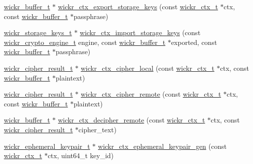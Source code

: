 \begin{DoxyCompactItemize}
\item 
\mbox{\hyperlink{structwickr__buffer}{wickr\+\_\+buffer\+\_\+t}} $\ast$ \mbox{\hyperlink{group__wickr__ctx_ga67e64bed3fc0a8ee550c0fc24d44c787}{wickr\+\_\+ctx\+\_\+export\+\_\+storage\+\_\+keys}} (const \mbox{\hyperlink{structwickr__ctx}{wickr\+\_\+ctx\+\_\+t}} $\ast$ctx, const \mbox{\hyperlink{structwickr__buffer}{wickr\+\_\+buffer\+\_\+t}} $\ast$passphrase)
\item 
\mbox{\hyperlink{structwickr__storage__keys}{wickr\+\_\+storage\+\_\+keys\+\_\+t}} $\ast$ \mbox{\hyperlink{group__wickr__ctx_gae344e5202193c4b92ee2686529285fe5}{wickr\+\_\+ctx\+\_\+import\+\_\+storage\+\_\+keys}} (const \mbox{\hyperlink{structwickr__crypto__engine}{wickr\+\_\+crypto\+\_\+engine\+\_\+t}} engine, const \mbox{\hyperlink{structwickr__buffer}{wickr\+\_\+buffer\+\_\+t}} $\ast$exported, const \mbox{\hyperlink{structwickr__buffer}{wickr\+\_\+buffer\+\_\+t}} $\ast$passphrase)
\item 
\mbox{\hyperlink{structwickr__cipher__result}{wickr\+\_\+cipher\+\_\+result\+\_\+t}} $\ast$ \mbox{\hyperlink{group__wickr__ctx_gaeff6704dded2d44f689eca5ad25843f8}{wickr\+\_\+ctx\+\_\+cipher\+\_\+local}} (const \mbox{\hyperlink{structwickr__ctx}{wickr\+\_\+ctx\+\_\+t}} $\ast$ctx, const \mbox{\hyperlink{structwickr__buffer}{wickr\+\_\+buffer\+\_\+t}} $\ast$plaintext)
\item 
\mbox{\hyperlink{structwickr__cipher__result}{wickr\+\_\+cipher\+\_\+result\+\_\+t}} $\ast$ \mbox{\hyperlink{group__wickr__ctx_ga0b985fb2cd05fb482b5ed175dfd650a0}{wickr\+\_\+ctx\+\_\+cipher\+\_\+remote}} (const \mbox{\hyperlink{structwickr__ctx}{wickr\+\_\+ctx\+\_\+t}} $\ast$ctx, const \mbox{\hyperlink{structwickr__buffer}{wickr\+\_\+buffer\+\_\+t}} $\ast$plaintext)
\item 
\mbox{\hyperlink{structwickr__buffer}{wickr\+\_\+buffer\+\_\+t}} $\ast$ \mbox{\hyperlink{group__wickr__ctx_gacc1038d3690ba4860b74f13239c65600}{wickr\+\_\+ctx\+\_\+decipher\+\_\+remote}} (const \mbox{\hyperlink{structwickr__ctx}{wickr\+\_\+ctx\+\_\+t}} $\ast$ctx, const \mbox{\hyperlink{structwickr__cipher__result}{wickr\+\_\+cipher\+\_\+result\+\_\+t}} $\ast$cipher\+\_\+text)
\item 
\mbox{\hyperlink{structwickr__ephemeral__keypair}{wickr\+\_\+ephemeral\+\_\+keypair\+\_\+t}} $\ast$ \mbox{\hyperlink{group__wickr__ctx_ga45b2531085c430942122dcbf45736e10}{wickr\+\_\+ctx\+\_\+ephemeral\+\_\+keypair\+\_\+gen}} (const \mbox{\hyperlink{structwickr__ctx}{wickr\+\_\+ctx\+\_\+t}} $\ast$ctx, uint64\+\_\+t key\+\_\+id)
\item 

\end{DoxyCompactItemize}
